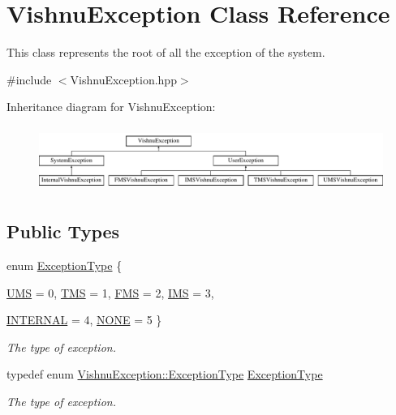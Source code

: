 \hypertarget{classVishnuException}{
\section{VishnuException Class Reference}
\label{classVishnuException}
}


This class represents the root of all the exception of the system.  




{\ttfamily \#include $<$VishnuException.hpp$>$}

Inheritance diagram for VishnuException:\begin{figure}[H]
\begin{center}
\leavevmode
\includegraphics[height=2.153846cm]{classVishnuException}
\end{center}
\end{figure}
\subsection*{Public Types}
\begin{DoxyCompactItemize}
\item 
enum \hyperlink{classVishnuException_ad9de1e07d1e54a454cd2f7f3883de001}{ExceptionType} \{ \par
\hyperlink{classVishnuException_ad9de1e07d1e54a454cd2f7f3883de001a75dfbd63efc45f759335784afc2a21df}{UMS} =  0, 
\hyperlink{classVishnuException_ad9de1e07d1e54a454cd2f7f3883de001a06dc1eee51aff5d00237e67ea4327035}{TMS} =  1, 
\hyperlink{classVishnuException_ad9de1e07d1e54a454cd2f7f3883de001a8bf79f006a7f499ff19a29f961e3b587}{FMS} =  2, 
\hyperlink{classVishnuException_ad9de1e07d1e54a454cd2f7f3883de001a1cad27b5570c824a1ed1dbe3cc2a23ed}{IMS} =  3, 
\par
\hyperlink{classVishnuException_ad9de1e07d1e54a454cd2f7f3883de001aa62f896d183527469a8281313eae4ea8}{INTERNAL} =  4, 
\hyperlink{classVishnuException_ad9de1e07d1e54a454cd2f7f3883de001aff77e716a0cf84478ddbd9b0f4737ce3}{NONE} =  5
 \}
\begin{DoxyCompactList}\small\item\em The type of exception. \item\end{DoxyCompactList}\item 
\hypertarget{classVishnuException_aba758c9545d4f417123ce27c512d8f31}{
typedef enum \hyperlink{classVishnuException_ad9de1e07d1e54a454cd2f7f3883de001}{VishnuException::ExceptionType} \hyperlink{classVishnuException_aba758c9545d4f417123ce27c512d8f31}{ExceptionType}}
\label{classVishnuException_aba758c9545d4f417123ce27c512d8f31}

\begin{DoxyCompactList}\small\item\em The type of exception. \item\end{DoxyCompactList}\end{DoxyCompactItemize}
